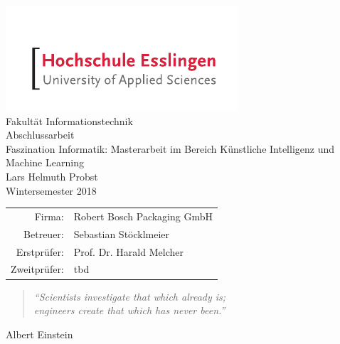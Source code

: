 

\usepackage[T1]{fontenc}
\usepackage[utf8]{inputenc}
\usepackage{graphicx}





\begin{titlepage}
\begin{center}
\includegraphics[scale=2.5]{images/he_logo.pdf}\\
\vspace{1cm} Fakultät Informationstechnik\\
\vspace{1.5cm} \Large Abschlussarbeit \\
\vspace{1.5cm} \Huge Faszination Informatik: Masterarbeit im Bereich Künstliche Intelligenz und Machine Learning\\
\vspace{1.5cm} \Large Lars Helmuth Probst\\\normalsize
\vspace{0.5cm} Wintersemester 2018\\\normalsize
\vfill{}
\begin{tabular}{rl}
Firma: & Robert Bosch Packaging GmbH\\[0.5cm]
Betreuer: & Sebastian Stöcklmeier\\[0.5cm]
Erstprüfer: & Prof. Dr. Harald Melcher\\[0.5cm]
Zweitprüfer: & tbd\\
\end{tabular}
\end{center}
\end{titlepage}

\thispagestyle{empty}
\vspace*{2cm}
\begin{center}
\begin{minipage}{12cm}
\begin{center}
\end{center}
\end{minipage}

\vfill{}

\begin{minipage}{10cm}
\begin{quote}
\textit{"`Scientists investigate that which already is;\\ engineers create that which has never been."'}
\end{quote}
\hfill Albert Einstein
\end{minipage}
\end{center}

